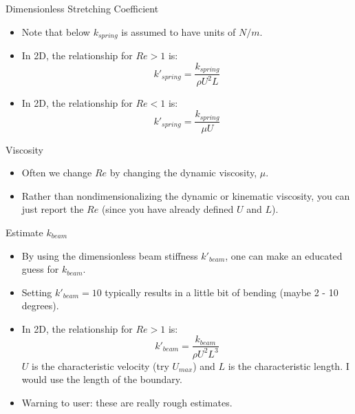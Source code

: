 \documentclass{beamer}
\begin{document}
\begin{frame}{Dimensionless Stretching Coefficient}
\begin{itemize}
\item Note that below \( k_{spring} \) is assumed to have units of \( N/m \).
\item In 2D, the relationship for \( Re > 1 \) is:
\[
k'_{spring} = \frac{k_{spring}}{\rho U^2 L}
\]

\item In 2D, the relationship for \( Re < 1 \) is:
\[
k'_{spring} = \frac{k_{spring}}{\mu U}
\]
\end{itemize}
\end{frame}

\begin{frame}{Viscosity}
\begin{itemize}
\item Often we change $Re$ by changing the dynamic viscosity, $\mu$.
\item Rather than nondimensionalizing the dynamic or kinematic viscosity, you can just report the \( Re \) (since you have already defined \( U \) and \( L \)).
\end{itemize}
\end{frame}

\begin{frame}{Estimate \( k_{beam} \)}
\begin{itemize}
\item By using the dimensionless beam stiffness \( k'_{beam} \), one can make an educated guess for \( k_{beam} \).

\item Setting \( k'_{beam} = 10 \) typically results in a little bit of bending (maybe 2 - 10 degrees).

\item In 2D, the relationship for \( Re > 1 \) is:
\[
k'_{beam} = \frac{k_{beam}}{\rho U^2 L^3}
\]
\( U \) is the characteristic velocity (try \( U_{max} \)) and \( L \) is the characteristic length. I would use the length of the boundary.

\item Warning to user: these are really rough estimates.
\end{itemize}
\end{frame}
\end{document}
